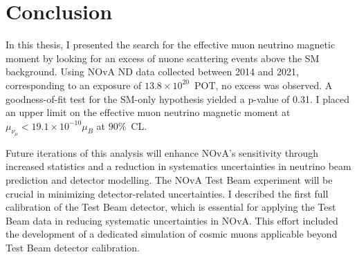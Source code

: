 \chapter{Conclusion}\label{sec:Conclusion}

In this thesis, I presented the search for the effective muon neutrino magnetic moment by looking for an excess of \gls{nuone} scattering events above the \gls{SM} background. Using \gls{NOvA} \gls{ND} data collected between 2014 and 2021, corresponding to an exposure of $13.8\times10^{20}$~\gls{POT}, no excess was observed. A goodness-of-fit test for the \gls{SM}-only hypothesis yielded a p-value of 0.31. I placed an upper limit on the effective muon neutrino magnetic moment at $\mu_{\nu_\mu}<19.1\times 10^{-10}\mu_B$ at $90\%$~\gls{CL}.

Future iterations of this analysis will enhance \gls{NOvA}'s sensitivity through increased statistics and a reduction in systematics uncertainties in neutrino beam prediction and detector modelling. The NOvA Test Beam experiment will be crucial in minimizing detector-related uncertainties. I described the first full calibration of the Test Beam detector, which is essential for applying the Test Beam data in reducing systematic uncertainties in \gls{NOvA}. This effort included the development of a dedicated simulation of cosmic muons applicable beyond Test Beam detector calibration.